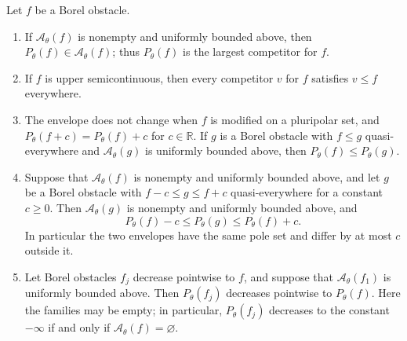 \begin{proposition}\label{prop:obstacle-envelope-maximal-member}
Let $f$ be a Borel obstacle.
\begin{enumerate}
 \item If $\mathcal A_\theta(f)$ is nonempty and uniformly bounded above, then $P_\theta(f)\in\mathcal A_\theta(f)$; thus $P_\theta(f)$ is the largest competitor for $f$.
 \item If $f$ is upper semicontinuous, then every competitor $v$ for $f$ satisfies $v\leq f$ everywhere.
 \item The envelope does not change when $f$ is modified on a pluripolar set, and $P_\theta(f+c)=P_\theta(f)+c$ for $c\in\mathbb R$. If $g$ is a Borel obstacle with $f\leq g$ quasi-everywhere and $\mathcal A_\theta(g)$ is uniformly bounded above, then $P_\theta(f)\leq P_\theta(g)$.
 \item Suppose that $\mathcal A_\theta(f)$ is nonempty and uniformly bounded above, and let $g$ be a Borel obstacle with $f-c\leq g\leq f+c$ quasi-everywhere for a constant $c\geq0$. Then $\mathcal A_\theta(g)$ is nonempty and uniformly bounded above, and
 \[
  P_\theta(f)-c\leq P_\theta(g)\leq P_\theta(f)+c.
 \]
 In particular the two envelopes have the same pole set and differ by at most $c$ outside it.
 \item Let Borel obstacles $f_j$ decrease pointwise to $f$, and suppose that $\mathcal A_\theta(f_1)$ is uniformly bounded above. Then $P_\theta(f_j)$ decreases pointwise to $P_\theta(f)$. Here the families may be empty; in particular, $P_\theta(f_j)$ decreases to the constant $-\infty$ if and only if $\mathcal A_\theta(f)=\varnothing$.
\end{enumerate}
\end{proposition}
